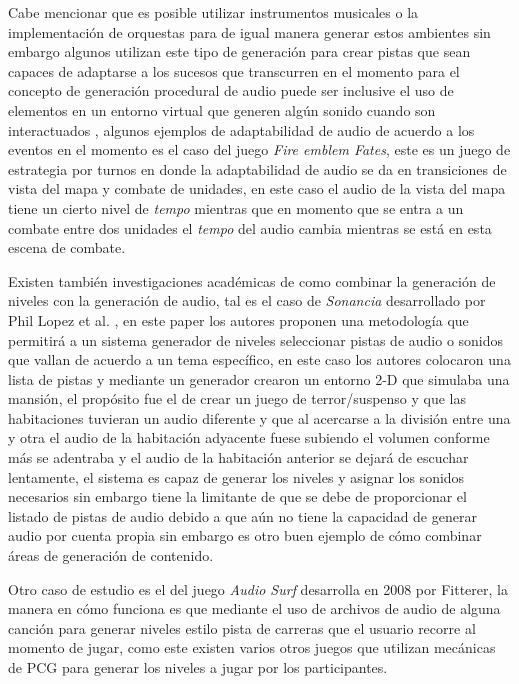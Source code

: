 Cabe mencionar que es posible utilizar instrumentos musicales o la
implementación de orquestas para de igual manera generar estos ambientes sin
embargo algunos utilizan este tipo de generación para crear pistas que sean
capaces de adaptarse a los sucesos que transcurren en el momento para el
concepto de generación procedural de audio puede ser inclusive el uso de
elementos en un entorno virtual que generen algún sonido cuando son
interactuados \cite{garner2014sonic}, algunos ejemplos de adaptabilidad de audio
de acuerdo a los eventos en el momento es el caso del juego \textit{Fire emblem
Fates}, este es un juego de estrategia por turnos en donde la adaptabilidad de
audio se da en transiciones de vista del mapa y combate de unidades, en este
caso el audio de la vista del mapa tiene un cierto nivel de \textit{tempo}
mientras que en momento que se entra a un combate entre dos unidades el
\textit{tempo} del audio cambia mientras se está en esta escena de combate.

Existen también investigaciones académicas de como combinar la generación de
niveles con la generación de audio, tal es el caso de \textit{Sonancia}
desarrollado por Phil Lopez et al. \cite{lopes2015sonancia}, en este paper los
autores proponen una metodología que permitirá a un sistema generador de niveles
seleccionar pistas de audio o sonidos que vallan de acuerdo a un tema específico,
en este caso los autores colocaron una lista de pistas y mediante un generador
crearon un entorno 2-D que simulaba una mansión, el propósito fue el de crear un
juego de terror/suspenso y que las habitaciones tuvieran un audio diferente y
que al acercarse a la división entre una y otra el audio de la habitación
adyacente fuese subiendo el volumen conforme más se adentraba y el audio de la
habitación anterior se dejará de escuchar lentamente, el sistema es capaz de
generar los niveles y asignar los sonidos necesarios sin embargo tiene la
limitante de que se debe de proporcionar el listado de pistas de audio debido a
que aún no tiene la capacidad de generar audio por cuenta propia sin embargo es
otro buen ejemplo de cómo combinar áreas de generación de contenido.

Otro caso de estudio es el del juego \textit{Audio Surf} desarrolla en 2008 por
Fitterer, la manera en cómo funciona es que mediante el uso de archivos de audio
de alguna canción para generar niveles estilo pista de carreras que el usuario
recorre al momento de jugar, como este existen varios otros juegos que utilizan
mecánicas de PCG para generar los niveles a jugar por los participantes.

